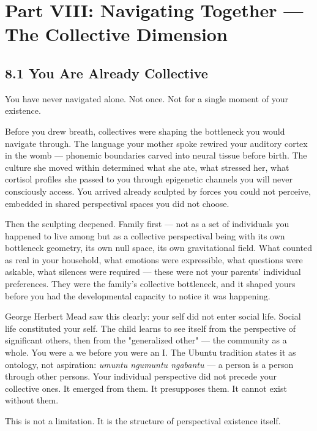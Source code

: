 \section*{Part VIII: Navigating Together — The Collective Dimension}


\subsection*{8.1 You Are Already Collective}


You have never navigated alone. Not once. Not for a single moment of your existence.


Before you drew breath, collectives were shaping the bottleneck you would navigate through. The language your mother spoke rewired your auditory cortex in the womb — phonemic boundaries carved into neural tissue before birth. The culture she moved within determined what she ate, what stressed her, what cortisol profiles she passed to you through epigenetic channels you will never consciously access. You arrived already sculpted by forces you could not perceive, embedded in shared perspectival spaces you did not choose.


Then the sculpting deepened. Family first — not as a set of individuals you happened to live among but as a collective perspectival being with its own bottleneck geometry, its own null space, its own gravitational field. What counted as real in your household, what emotions were expressible, what questions were askable, what silences were required — these were not your parents' individual preferences. They were the family's collective bottleneck, and it shaped yours before you had the developmental capacity to notice it was happening.


George Herbert Mead saw this clearly: your self did not enter social life. Social life constituted your self. The child learns to see itself from the perspective of significant others, then from the "generalized other" — the community as a whole. You were a we before you were an I. The Ubuntu tradition states it as ontology, not aspiration: \textit{umuntu ngumuntu ngabantu} — a person is a person through other persons. Your individual perspective did not precede your collective ones. It emerged from them. It presupposes them. It cannot exist without them.


This is not a limitation. It is the structure of perspectival existence itself.



